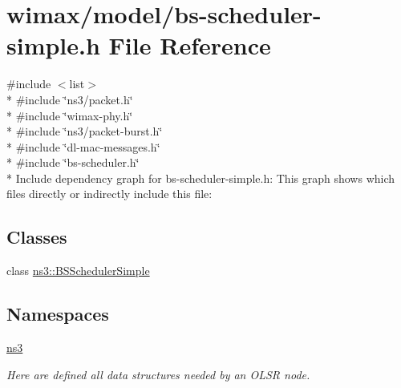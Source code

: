 \hypertarget{bs-scheduler-simple_8h}{}\section{wimax/model/bs-\/scheduler-\/simple.h File Reference}
\label{bs-scheduler-simple_8h}
{\ttfamily \#include $<$list$>$}\\*
{\ttfamily \#include \char`\"{}ns3/packet.\+h\char`\"{}}\\*
{\ttfamily \#include \char`\"{}wimax-\/phy.\+h\char`\"{}}\\*
{\ttfamily \#include \char`\"{}ns3/packet-\/burst.\+h\char`\"{}}\\*
{\ttfamily \#include \char`\"{}dl-\/mac-\/messages.\+h\char`\"{}}\\*
{\ttfamily \#include \char`\"{}bs-\/scheduler.\+h\char`\"{}}\\*
Include dependency graph for bs-\/scheduler-\/simple.h\+:
This graph shows which files directly or indirectly include this file\+:
\subsection*{Classes}
\begin{DoxyCompactItemize}
\item 
class \hyperlink{classns3_1_1BSSchedulerSimple}{ns3\+::\+B\+S\+Scheduler\+Simple}
\end{DoxyCompactItemize}
\subsection*{Namespaces}
\begin{DoxyCompactItemize}
\item 
 \hyperlink{namespacens3}{ns3}
\begin{DoxyCompactList}\small\item\em Here are defined all data structures needed by an O\+L\+SR node. \end{DoxyCompactList}\end{DoxyCompactItemize}
